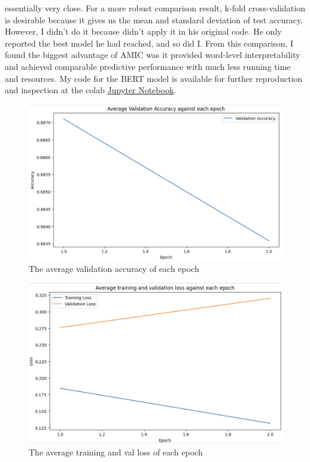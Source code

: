 \documentclass[aoas]{imsart}
\numberwithin{equation}{section}
\theoremstyle{plain}
\theoremstyle{remark}
\begin{document}
essentially very close. For a more robust comparison result, k-fold cross-validation is desirable because it gives us the mean and standard deviation of test accuracy. However, I didn't do it because \cite{chenyu} didn't apply it in his original code. He only reported the best model he had reached, and so did I. From this comparison, I found the biggest advantage of AMIC was it provided word-level interpretability and achieved comparable predictive performance with much less running time and resources. My code for the BERT model is available for further reproduction and inspection at the colab \href{https://colab.research.google.com/drive/1oZDrhat5LBbGv2ug-e2SBBOMlj6LoNyu?usp=sharing}{Jupyter Notebook}.    
\begin{figure}[ht]
\includegraphics[scale=0.3]{img/bert_acc.png}
\caption{The average validation accuracy of each epoch}
\label{Fig15: bert_acc}
\end{figure}
\begin{figure}[ht]
\includegraphics[scale=0.3]{img/bert_loss.png}
\caption{The average training and val loss of each epoch}
\label{Fig16: bert_loss}
\end{figure}
\end{document}
